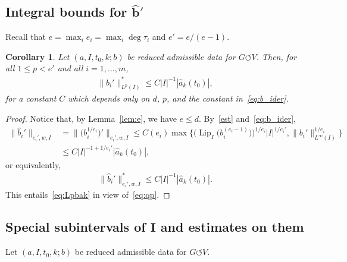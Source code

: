 \documentclass[pdftex]{sigma}
\numberwithin{equation}{section}
\newtheorem{Corollary}[Theorem]{Corollary}
\def\ta{\tau}
\def\we{\hat}
\def\acts{\circlearrowleft}
\let\on=\operatorname
\begin{document}
\subsection[Integral bounds for hat b']
{Integral bounds for $\boldsymbol{\we b'}$}


Recall that $e = \max_i e_i = \max_i \deg \ta_i$ and $e' = e/(e-1)$.

\begin{Corollary} \label{lem:Lpbak}
 Let $(a, I, t_0, k; b)$ be reduced admissible data for $G \acts V$.
 Then, for all $1 \le p < e'$ and all $i=1,\dots,m$,
 \begin{gather} \label{eq:Lpbak}
\big \|\we b_i'\big\|^*_{L^p(I)} \le C |I|^{-1} |\we a_k(t_0)|,
 \end{gather}
 for a constant $C$ which depends only on $d$, $p$, and the constant in~\eqref{eq:b_ider}.
\end{Corollary}

\begin{proof}
 Notice that, by Lemma~\ref{lem:e}, we have $e \le d$. By~\eqref{est} and~\eqref{eq:b_ider},
 \begin{align*}
 \big\| \we b_i'\big\|_{e_i',w,I}&= \big\| \big(b_i^{1/e_i}\big)'\big\|_{e_i',w,I}\le C(e_i) \max \Big\{\big(\on{Lip}_{I}\big( b_i^{(e_i-1)}\big)\big)^{1/e_i}|I|^{1/e_i'},
 \|b_i'\|_{L^\infty(I)}^{1/e_i}\Big\}
 \\
 &\le C |I|^{-1 +1/e_i'} |\we a_k (t_0)|,
\end{align*}
or equivalently,
\begin{gather*}
 \big\|\we b_i'\big\|^*_{e_i',w,I} \le C |I|^{-1} | \we a_k (t_0)|.
\end{gather*}
This entails~\eqref{eq:Lpbak} in view of~\eqref{eq:qp}.
\end{proof}


\subsection[Special subintervals of I and estimates on them]
{Special subintervals of $\boldsymbol I$ and estimates on them}\label{subintervals}

Let $(a, I, t_0, k; b)$ be reduced admissible data for $G \acts V$.
\end{document}
